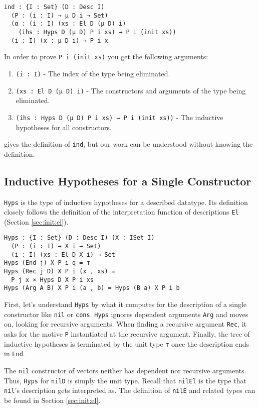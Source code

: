 \documentclass[preprint,nonatbib]{sigplanconf}
\newcommand{\refsec}[1]{Section \ref{sec:#1}}
\begin{document}
\begin{verbatim}
ind : {I : Set} (D : Desc I)
  (P : (i : I) → μ D i → Set)
  (α : (i : I) (xs : El D (μ D) i)
    (ihs : Hyps D (μ D) P i xs) → P i (init xs))
  (i : I) (x : μ D i) → P i x
\end{verbatim}

In order to prove {\tt P i (init xs)} you get the following
arguments:

\begin{enumerate}
\item{{\tt (i : I)}} - The index of the type being eliminated.
\item{{\tt (xs : El D (μ D) i)}} - The constructors and arguments of the type
  being eliminated.
\item{{\tt (ihs : Hyps D (μ D) P i xs) → P i (init xs))}} - The inductive
  hypotheses for all constructors.
\end{enumerate}

\citet{mcbride2010ornamental} gives the definition of {\tt ind}, but
our work can be understood without knowing the definition.

\subsection{Inductive Hypotheses for a Single Constructor}

{\tt Hyps} is the type of inductive hypotheses for a described
datatype. Its definition closely follows the definition of
the interpretation function of descriptions {\tt El}
(\refsec{init:el}).

\begin{verbatim}
Hyps : {I : Set} (D : Desc I) (X : ISet I)
  (P : (i : I) → X i → Set)
  (i : I) (xs : El D X i) → Set
Hyps (End j) X P i q = ⊤
Hyps (Rec j D) X P i (x , xs) =
  P j x × Hyps D X P i xs
Hyps (Arg A B) X P i (a , b) = Hyps (B a) X P i b
\end{verbatim}

First, let's understand {\tt Hyps} by what it computes for the
description of a single constructor like {\tt nil} or {\tt cons}.
{\tt Hyps} ignores dependent arguments {\tt Arg} and moves on, looking
for recursive arguments. When finding a recursive argument {\tt Rec}, it
asks for the motive {\tt P} instantiated at the recursive argument.
Finally, the tree of inductive hypotheses is terminated by the unit
type {\tt ⊤} once the description ends in {\tt End}.

The {\tt nil} constructor of vectors neither has dependent nor
recursive arguments. Thus, {\tt Hyps} for {\tt nilD} is simply
the unit type. Recall that {\tt nilEl} is the type that
{\tt nil}'s description gets interpreted as. The definition of
{\tt nilE} and related types can be found in \refsec{init:el}.
\end{document}
